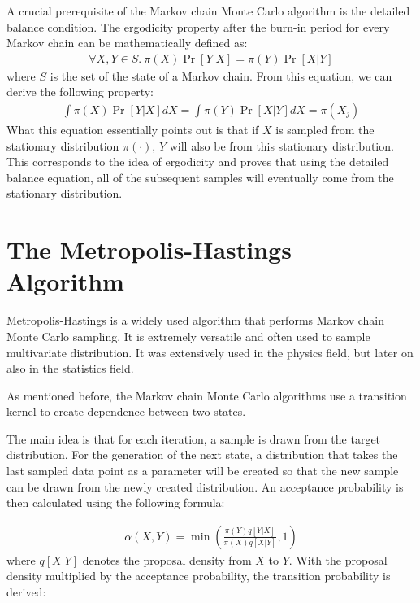 A crucial prerequisite of the Markov chain Monte Carlo algorithm is the detailed balance condition. The ergodicity property after the burn-in period for every Markov chain can be mathematically defined as:
\begin{align}
\forall X, Y\in S. \ \pi(X) \Pr[Y|X] = \pi(Y) \Pr[X|Y]
\end{align}
\cite{mcmc_practice} where $S$ is the set of the state of a Markov chain. From this equation, we can derive the following property:
\begin{align}
\int \pi(X) \Pr[Y|X] dX= \int \pi(Y) \Pr[X|Y] dX =\pi(X_j)
\end{align}
What this equation essentially points out is that if $X$ is sampled from the stationary distribution $\pi(\cdot)$, $Y$ will also be from this stationary distribution.\cite{mcmc_practice} This corresponds to the idea of ergodicity and proves that using the detailed balance equation, all of the subsequent samples will eventually come from the stationary distribution.

\section{The Metropolis-Hastings Algorithm}
Metropolis-Hastings is a widely used algorithm that performs Markov chain Monte Carlo sampling. It is extremely versatile and often used to sample multivariate distribution. It was extensively used in the physics field, but later on also in the statistics field.\cite{understanding_mh}

As mentioned before, the Markov chain Monte Carlo algorithms use a transition kernel to create dependence between two states.

The main idea is that for each iteration, a sample is drawn from the target distribution. For the generation of the next state, a distribution that takes the last sampled data point as a parameter will be created so that the new sample can be drawn from the newly created distribution.\cite{mcmc_practice} An acceptance probability is then calculated using the following formula:

\begin{align}
\alpha(X, Y) = \min (\frac{\pi(Y)q[Y|X]}{\pi(X)q[X|Y]}, 1)
\end{align}
where $q[X|Y]$ denotes the proposal density from $X$ to $Y$. With the proposal density multiplied by the acceptance probability, the transition probability is derived:

